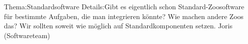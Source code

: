 
%
	{Thema:}{Standardsoftware}%
	{Details:}{Gibt es eigentlich schon Standard-Zoosoftware für bestimmte Aufgaben, die man integrieren könnte? Wie machen andere Zoos das? Wir sollten soweit wie möglich auf Standardkomponenten setzen.}%
	{Joris (Softwareteam)}

